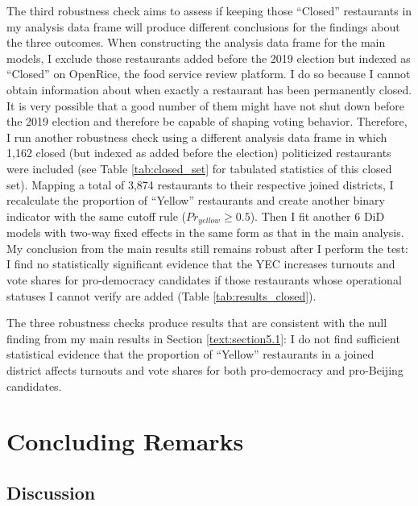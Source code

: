 \documentclass[letterpaper, 12pt]{article}
\begin{document}
The third robustness check aims to assess if keeping those ``Closed'' restaurants in my analysis data frame will produce different conclusions for the findings about the three outcomes. When constructing the analysis data frame for the main models, I exclude those restaurants added before the 2019 election but indexed as ``Closed'' on OpenRice, the food service review platform. I do so because I cannot obtain information about when exactly a restaurant has been permanently closed. It is very possible that a good number of them might have not shut down before the 2019 election and therefore be capable of shaping voting behavior. Therefore, I run another robustness check using a different analysis data frame in which 1,162 closed (but indexed as added before the election) politicized restaurants were included (see Table \ref{tab:closed_set} for tabulated statistics of this closed set). Mapping a total of 3,874 restaurants to their respective joined districts, I recalculate the proportion of ``Yellow'' restaurants and create another binary indicator with the same cutoff rule ($Pr_{yellow} \geq 0.5$). Then I fit another 6 DiD models with two-way fixed effects in the same form as that in the main analysis. My conclusion from the main results still remains robust after I perform the test: I find no statistically significant evidence that the YEC increases turnouts and vote shares for pro-democracy candidates if those restaurants whose operational statuses I cannot verify are added (Table \ref{tab:results_closed}).

The three robustness checks produce results that are consistent with the null finding from my main results in Section \ref{text:section5.1}: I do not find sufficient statistical evidence that the proportion of ``Yellow'' restaurants in a joined district affects turnouts and vote shares for both pro-democracy and pro-Beijing candidates.




\section{Concluding Remarks}

\subsection{Discussion}
\end{document}
